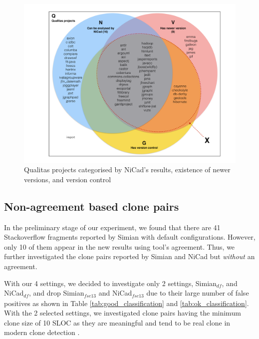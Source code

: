 \documentclass{sig-alternate-05-2015}
\begin{document}
\begin{figure}
	\centering
	\includegraphics[width=0.7\linewidth]{n+v+g}
	\caption{Qualitas projects categorised by NiCad's results, existence of newer versions, and version control}
	\label{fig:n+v+g}
\end{figure}

\subsection{Non-agreement based clone pairs}
In the preliminary stage of our experiment, we found that there are 41 Stackoverflow fragments reported by Simian with default configurations. However, only 10 of them appear in the new results using tool's agreement. Thus, we further investigated the clone pairs reported by Simian and NiCad but \textit{without} an agreement. 

With our 4 settings, we decided to investigate only 2 settings, Simian$_{df}$, and NiCad$_{df}$, and drop Simian$_{\mathrm{\textit{fse13}}}$ and NiCad$_{\mathrm{\textit{fse13}}}$ due to their large number of false positives as shown in Table \ref{tab:good_classification} and \ref{tab:ok_classification}. With the 2 selected settings, we investigated clone pairs having the minimum clone size of 10 SLOC as they are meaningful and tend to be real clone in modern clone detection \cite{Sajnani2016}. 
\end{document}
